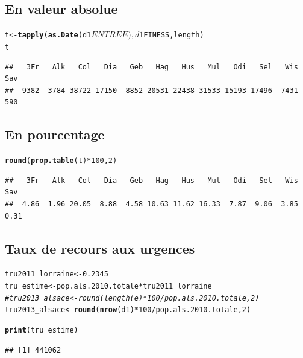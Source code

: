 \documentclass[12pt,english,french,twoside]{report}\usepackage[]{graphicx}\usepackage[]{color}
\makeatletter
\newcommand{\hlcom}[1]{\textcolor[rgb]{0.678,0.584,0.686}{\textit{#1}}}%
\newcommand{\hlkwd}[1]{\textcolor[rgb]{0.737,0.353,0.396}{\textbf{#1}}}%
\newenvironment{kframe}{%
 \def\at@end@of@kframe{}%
 \ifinner\ifhmode%
  \def\at@end@of@kframe{\end{minipage}}%
  \begin{minipage}{\columnwidth}%
 \fi\fi%
 \def\FrameCommand##1{\hskip\@totalleftmargin \hskip-\fboxsep
 \colorbox{shadecolor}{##1}\hskip-\fboxsep
     \hskip-\linewidth \hskip-\@totalleftmargin \hskip\columnwidth}%
 \MakeFramed {\advance\hsize-\width
   \@totalleftmargin\z@ \linewidth\hsize
   \@setminipage}}%
 {\par\unskip\endMakeFramed%
 \at@end@of@kframe}
\newenvironment{knitrout}{}{} %
\makeatother
\begin{document}
\subsection*{En valeur absolue}
\begin{knitrout}
\color{fgcolor}\begin{kframe}
\begin{alltt}
t <- \hlkwd{tapply}(\hlkwd{as.Date}(d1$ENTREE), d1$FINESS, length)
t
\end{alltt}
\begin{verbatim}
##   3Fr   Alk   Col   Dia   Geb   Hag   Hus   Mul   Odi   Sel   Wis   Sav 
##  9382  3784 38722 17150  8852 20531 22438 31533 15193 17496  7431   590
\end{verbatim}
\end{kframe}
\end{knitrout}


\subsection*{En pourcentage}
\begin{knitrout}
\color{fgcolor}\begin{kframe}
\begin{alltt}
\hlkwd{round}(\hlkwd{prop.table}(t) * 100, 2)
\end{alltt}
\begin{verbatim}
##   3Fr   Alk   Col   Dia   Geb   Hag   Hus   Mul   Odi   Sel   Wis   Sav 
##  4.86  1.96 20.05  8.88  4.58 10.63 11.62 16.33  7.87  9.06  3.85  0.31
\end{verbatim}
\end{kframe}
\end{knitrout}


\subsection*{Taux de recours aux urgences}
\begin{knitrout}
\color{fgcolor}\begin{kframe}
\begin{alltt}
tru2011_lorraine <- 0.2345
tru_estime <- pop.als.2010.totale * tru2011_lorraine
\hlcom{# tru2013_alsace<-round(length(e)*100/pop.als.2010.totale,2)}
tru2013_alsace <- \hlkwd{round}(\hlkwd{nrow}(d1) * 100/pop.als.2010.totale, 2)

\hlkwd{print}(tru_estime)
\end{alltt}
\begin{verbatim}
## [1] 441062
\end{verbatim}
\end{kframe}
\end{knitrout}
\end{document}
